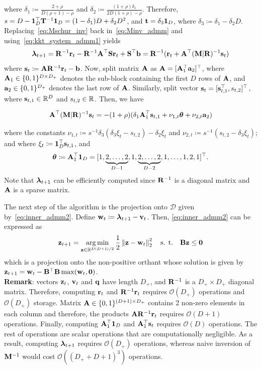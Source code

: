 where $\delta_1\coloneqq \frac{2+\rho}{D(\rho+1)-\rho}$ and $\delta_2\coloneqq \frac{(1+\rho)\delta_1}{2D(1+\rho)-\rho}$. Therefore, $s = D-\mathbf{1}_D^\top\mathbf{T}^{-1}\mathbf{1}_D = (1 - \delta_1)D + \delta_2 D^2$, and $\mathbf{t}=\delta_3\mathbf{1}_D$, where $\delta_3\coloneqq \delta_1-\delta_2D$. Replacing~\eqref{eq:Mschur_inv} back in~\eqref{eq:Minv_admm} and using~\eqref{eq:kkt_system_admm1} yields
\begin{equation*}
	\lh_{t+1} = \Rm^{-1}\r_t - \Rm^{-1}\A^\top\S\r_t + \S^\top\b = 
	\Rm^{-1}(\r_t + \A^\top(\M|\Rm)^{-1}\s_t)
\end{equation*}
where $\mathbf{s}_t\coloneqq \mathbf{A}\mathbf{R}^{-1}\mathbf{r}_t-\mathbf{b}$. Now, split matrix $\mathbf{A}$ as $\mathbf{A}=[\mathbf{A}_1^\top \mathbf{a}_2]^\top$, where $\mathbf{A}_1\in\{0,1\}^{D\times D_+}$ denotes the sub-block containing the first $D$ rows of $\mathbf{A}$, and $\mathbf{a}_2\in\{0,1\}^{D_+}$ denotes the last row of $\mathbf{A}$. Similarly, split vector $\mathbf{s}_t=[\mathbf{s}_{t,1}^\top, s_{t,2}]^\top$, where $\mathbf{s}_{t,1}\in\mathbb{R}^D$ and $s_{t,2}\in\mathbb{R}$. Then, we have 
\begin{small}
	\begin{align*}
		\mathbf{A}^\top(\mathbf{M}|\mathbf{R})^{-1}\mathbf{s}_t = -(1+\rho)(\delta_1\mathbf{A}_1^\top\mathbf{s}_{t,1} + \nu_{1,t}\boldsymbol{\theta} + \nu_{2,t}\mathbf{a}_2)
	\end{align*}
\end{small}%
where the constants $\nu_{1,t}\coloneqq s^{-1}\delta_3(\delta_3\xi_t-s_{t,2}) - \delta_2\xi_t$ and $\nu_{2,t}\coloneqq s^{-1}(s_{t,2} - \delta_3\xi_t)$; and where $\xi_t\coloneqq \mathbf{1}_D^\top\mathbf{s}_{t,1}$, and
\begin{equation*}
	\boldsymbol{\theta}\coloneqq\mathbf{A}_1^\top\mathbf{1}_D = [1, \underbrace{2,\ldots,2}_{D-1},1,\underbrace{2,\ldots,2}_{D-2},1,\ldots,1,2,1]^\top.
\end{equation*}
Note that $\boldsymbol{\lambda}_{t+1}$ can be efficiently computed since $\mathbf{R}^{-1}$ is a diagonal matrix and $\mathbf{A}$ is a sparse matrix. 

The next step of the algorithm is the projection onto $\mathcal{D}$ given by~\eqref{eq:inner_admm2}. Define $\mathbf{w}_t\coloneqq \boldsymbol{\lambda}_{t+1}-\mathbf{v}_t$. Then, \eqref{eq:inner_admm2} can be expressed as
\begin{equation}\label{eq:z_problem}
	\mathbf{z}_{t+1} = \operatorname*{arg\,min}_{\boldsymbol{\mathbf{z}}\in\mathbb{R}^{D(D+1)/2}} \frac{1}{2}\left\|\mathbf{z}-\mathbf{w}_t\right\|_2^2\quad  \text{s. t.}\quad
	\mathbf{B}\mathbf{z}\leq \mathbf{0}
\end{equation}
\noindent which is a projection onto the non-positive orthant whose solution is given by $\mathbf{z}_{t+1} = \mathbf{w}_t - \mathbf{B}^\top\mathbf{B}\max(\mathbf{w}_t,\mathbf{0})$. \\

\noindent \textbf{Remark}: vectors $\mathbf{z}_t$, $\mathbf{v}_t$ and $\mathbf{q}$ have length $D_+$, and $\mathbf{R}^{-1}$ is a $D_+\times D_+$ diagonal matrix. Therefore, computing $\mathbf{r}_t$ and $\mathbf{R}^{-1}\mathbf{r}_t$  requires $\mathcal{O}(D_+)$ operations and $\mathcal{O}(D_+)$ storage. Matrix $\mathbf{A}\in\{0,1\}^{(D+1)\times D_+}$ contains 2 non-zero elements in each column and therefore, the products $\mathbf{A}\mathbf{R}^{-1}\mathbf{r}_t$ requires $\mathcal{O}(D+1)$ operations. Finally, computing $\mathbf{A}_1^\top\boldsymbol{1}_D$ and $\mathbf{A}_1^\top\mathbf{s}_t$ requires $\mathcal{O}(D)$ operations. The rest of operations are scalar operations that are computationally negligible. As a result, computing $\boldsymbol{\lambda}_{t+1}$ requires $\mathcal{O}(D_+)$ operations, whereas naive inversion of $\mathbf{M}^{-1}$ would cost $\mathcal{O}((D_++D+1)^3)$ operations.

